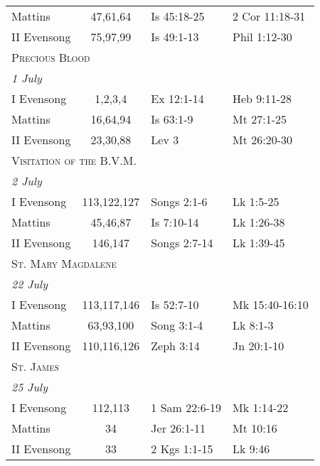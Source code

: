 \begin{longtable}{l c l l}
\hspace{1em} Mattins&47,61,64&Is 45:18-25&2 Cor 11:18-31\\
\hspace{1em} II Evensong&75,97,99&Is 49:1-13&Phil 1:12-30\\
%
\multicolumn{4}{l}{\textsc{Precious Blood}}\\
\multicolumn{4}{l}{\textit{1 July}}\\
\hspace{1em} I Evensong&1,2,3,4&Ex 12:1-14&Heb 9:11-28\\
\hspace{1em} Mattins&16,64,94&Is 63:1-9&Mt 27:1-25\\
\hspace{1em} II Evensong&23,30,88&Lev 3&Mt 26:20-30\\
\multicolumn{4}{l}{\textsc{Visitation of the B.V.M.}}\\
\multicolumn{4}{l}{\textit{2 July}}\\
\hspace{1em} I Evensong&113,122,127&Songs 2:1-6&Lk 1:5-25\\
\hspace{1em} Mattins&45,46,87&Is 7:10-14&Lk 1:26-38\\
\hspace{1em} II Evensong&146,147&Songs 2:7-14&Lk 1:39-45\\
\multicolumn{4}{l}{\textsc{St. Mary Magdalene}}\\
\multicolumn{4}{l}{\textit{22 July}}\\
\hspace{1em} I Evensong&113,117,146&Is 52:7-10&Mk 15:40-16:10\\
\hspace{1em} Mattins&63,93,100&Song 3:1-4&Lk 8:1-3\\
\hspace{1em} II Evensong&110,116,126&Zeph 3:14&Jn 20:1-10\\
\multicolumn{4}{l}{\textsc{St. James}}\\
\multicolumn{4}{l}{\textit{25 July}}\\
\hspace{1em} I Evensong&112,113&1 Sam 22:6-19&Mk 1:14-22\\
\hspace{1em} Mattins&34&Jer 26:1-11&Mt 10:16\\
\hspace{1em} II Evensong&33&2 Kgs 1:1-15&Lk 9:46\\

\end{longtable}
